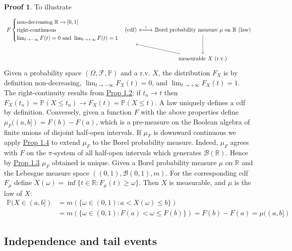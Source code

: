 \documentclass[hidelinks,11pt]{article}
\theoremstyle{definition}
\theoremstyle{dotless}
\newtheorem{prop}{Proof}[section]
\theoremstyle{remark}
\DeclareMathOperator{\1}{\mathbf{1}}
\DeclareMathOperator{\0}{\mathbf{0}}
\begin{document}
\begin{prop}
To illustrate
\[
  \begin{tikzcd}
    F\begin{cases}
\textrm{non-decreasing }\mathbb{R}\to[0,1]\\
\textrm{right-continuous}\\
\lim_{t\to-\infty}F(t)=0\textrm{ and }\lim_{t\to+\infty}F(t)=1
\end{cases}\textrm{(cdf)} \arrow{r}{!} & \textrm{Borel probability measure }\mu\textrm{ on }\mathbb{R}\textrm{ (law)}\arrow{l} \arrow{d} \\
     & \textrm{measurable }X\textrm{ (r.v.)} \arrow{ul}
  \end{tikzcd}
\]
Given a probability space $(\Omega,\mathcal{F},\mathbb{P})$ and a r.v. $X$, the distribution $F_X$ is by definition non-decreasing, $\lim_{t\to-\infty}F_X(t)=0$, and $\lim_{t\to+\infty}F_X(t)=1$. The right-continuity results from \hyperref[Prop 1.2]{Prop 1.2}: if $t_n\to t$ then
$F_X(t_n)=\mathbb{P}(X\leq t_n)\to F_X(t)=\mathbb{P}(X\leq t)$.\medbreak
A law uniquely defines a cdf by definition. Conversely, given a function $F$ with the above properties define $\mu_F((a,b])=F(b)-F(a)$, which is a pre-measure on the Boolean algebra of finite unions of disjoint half-open intervals. If $\mu_F$ is downward continuous we apply \hyperref[Prop 1.4]{Prop 1.4} to extend $\mu_F$ to the Borel probability measure. Indeed,\medbreak
$\mu_F$ agrees with $F$ on the $\pi$-system of all half-open intervals which generates $\mathcal{B}(\mathbb{R})$. Hence by \hyperref[Prop 1.3]{Prop 1.3} $\mu_F$ obtained is unique.\medbreak
Given a Borel probability measure $\mu$ on $\mathbb{R}$ and the Lebesgue measure space $((0,1),\mathcal{B}(0,1),m)$. For the corresponding cdf $F_\mu$ define $X(\omega)=\inf\{t\in\mathbb{R}:F_\mu(t)\geq\omega\}$. Then $X$ is measurable, and $\mu$ is the law of $X$:
\begin{align*}
\mathbb{P}(X\in(a,b])&=m(\{\omega\in(0,1):a<X(\omega)\leq b\})\\
&=m(\{\omega\in(0,1):F(a)<\omega\leq F(b)\})=F(b)-F(a)=\mu((a,b])
\end{align*}
\end{prop}

\subsection{Independence and tail events}
\end{document}
